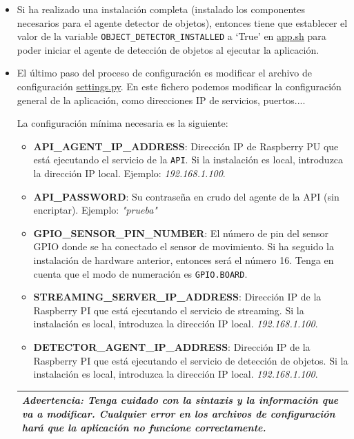 \begin{itemize}
\begin{tabular}{|p{15.5cm}|}
\end{tabular}

\item Si ha realizado una instalación completa (instalado los componentes necesarios para el agente detector de objetos), entonces tiene que establecer el valor de la variable \texttt{OBJECT\_DETECTOR\_INSTALLED} a `True' en \href{https://github.com/jmv74211/TFM_security_system_PI/blob/master/app.sh}{app.sh} para poder iniciar el agente de detección de objetos al ejecutar la aplicación.

\item El último paso del proceso de configuración es modificar el archivo de configuración \href{https://github.com/jmv74211/TFM_security_system_PI/blob/master/src/settings.py}{settings.py}. En este fichero podemos modificar la configuración general de la aplicación, como direcciones IP de servicios, puertos....

La configuración mínima necesaria es la siguiente:

\begin{itemize}
\item \textbf{API\_AGENT\_IP\_ADDRESS}: Dirección IP de Raspberry PU que está ejecutando el servicio de la \texttt{API}. Si la instalación es local, introduzca la dirección IP local. Ejemplo: \textit{192.168.1.100}.
\item \textbf{API\_PASSWORD}: Su contraseña en crudo del agente de la API (sin encriptar). Ejemplo: \textit{"prueba"}
\item \textbf{GPIO\_SENSOR\_PIN\_NUMBER}: El número de pin del sensor GPIO donde se ha conectado el sensor de movimiento. Si ha seguido la instalación de hardware anterior, entonces será el número 16. Tenga en cuenta que el modo de numeración es \texttt{GPIO.BOARD}.   
\item \textbf{STREAMING\_SERVER\_IP\_ADDRESS}: Dirección IP de la Raspberry PI que está ejecutando el servicio de streaming. Si la instalación es local, introduzca la dirección IP local. \textit{192.168.1.100}.    
\item \textbf{DETECTOR\_AGENT\_IP\_ADDRESS}: Dirección IP de la Raspberry PI que está ejecutando el servicio de detección de objetos. Si la instalación es local, introduzca la dirección IP local. \textit{192.168.1.100}.
 
\end{itemize}

\begin{tabular}{|p{15.5cm}|}
	
	\hline
	
	\textit{\textbf{Advertencia}: Tenga cuidado con la sintaxis y la información que va a modificar. Cualquier error en los archivos de configuración hará que la aplicación no funcione correctamente.}
	\\
	\hline
	
\end{tabular}

\end{itemize}

